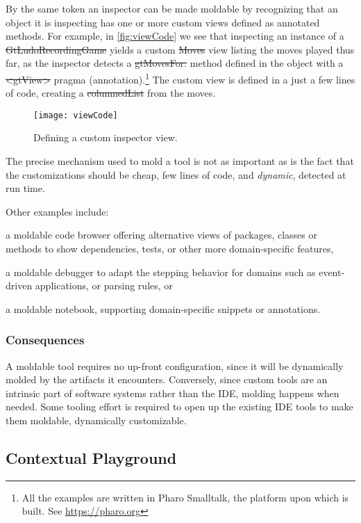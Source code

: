 \documentclass[sigconf]{acmart}
\renewcommand{\nbc}[3]{} %
\newcommand\kh[1]{\nbc{Konrad}{#1}{violet}}
\newcommand{\GT}{\lst{GT}\xspace} %
\begin{document}
By the same token an inspector can be made moldable by recognizing that an object it is inspecting has one or more custom views defined as annotated methods.
For example, in \autoref{fig:viewCode} we see that inspecting an instance of a \st{GtLudoRecordingGame} yields a custom \st{Moves} view listing the moves played thus far, as the inspector detects a \st{gtMovesFor:} method defined in the object with a \st{<gtView>} pragma (\ie annotation).\footnote{All the examples are written in Pharo Smalltalk, the platform upon which \GT is built. See \url{https://pharo.org}}
The custom view is defined in a just a few lines of code, creating a \st{columnedList} from the moves.

\begin{figure}[h]
  \texttt{[image: viewCode]}
  \caption{Defining a custom inspector view.}
  \label{fig:viewCode}
\end{figure}

The precise mechanism used to mold a tool is not as important as is the fact that the customizations should be cheap, \ie few lines of code, and \emph{dynamic}, \ie detected at run time.

Other examples include:
\begin{inparaenum}[(i)]
\item a moldable code browser offering alternative views of packages, classes or methods to show dependencies, tests, or other more domain-specific features,
\item a moldable debugger to adapt the stepping behavior for domains such as event-driven applications, or parsing rules, or
\item a moldable notebook, supporting domain-specific snippets or annotations.
\end{inparaenum}

\subsubsection*{Consequences}
A moldable tool requires no up-front configuration, since it will be dynamically molded by the artifacts it encounters.
Conversely, since custom tools are an intrinsic part of software systems rather than the IDE, molding happens when needed.
Some tooling effort is required to open up the existing IDE tools to make them moldable, \ie dynamically customizable.

\subsection*{Contextual Playground}\label{pat:contextualPlayground}
\kh{"Contextual Playground" is a pattern, but I'd label it "process" rather
than "tooling". On the other hand, it's also reasonable to have it right
before "Custom View", as it's a preparation to tooling work.}
\end{document}
